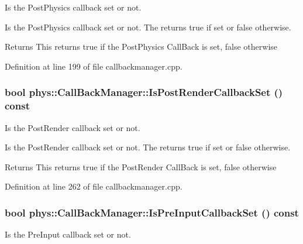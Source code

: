 Is the PostPhysics callback set or not. 

Is the PostPhysics callback set or not. The returns true if set or false otherwise. \begin{DoxyReturn}{Returns}
This returns true if the PostPhysics CallBack is set, false otherwise 
\end{DoxyReturn}


Definition at line 199 of file callbackmanager.cpp.

\hypertarget{classphys_1_1CallBackManager_aab2be377bc741b893e83dc69cadc0f76}{
\subsubsection[{IsPostRenderCallbackSet}]{\setlength{\rightskip}{0pt plus 5cm}bool phys::CallBackManager::IsPostRenderCallbackSet () const}}
\label{d1/d47/classphys_1_1CallBackManager_aab2be377bc741b893e83dc69cadc0f76}


Is the PostRender callback set or not. 

Is the PostRender callback set or not. The returns true if set or false otherwise. \begin{DoxyReturn}{Returns}
This returns true if the PostRender CallBack is set, false otherwise 
\end{DoxyReturn}


Definition at line 262 of file callbackmanager.cpp.

\hypertarget{classphys_1_1CallBackManager_adf39c71f0be97bcceb364621d1ccd77e}{
\subsubsection[{IsPreInputCallbackSet}]{\setlength{\rightskip}{0pt plus 5cm}bool phys::CallBackManager::IsPreInputCallbackSet () const}}
\label{d1/d47/classphys_1_1CallBackManager_adf39c71f0be97bcceb364621d1ccd77e}


Is the PreInput callback set or not. 

